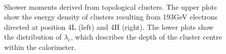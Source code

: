 \begin{figure}[!htb]
\begin{centering}
\\
\caption{Shower moments derived from topological clusters. The upper plots show the energy density of clusters resulting from 193GeV electrons directed at position 4L (left) and 4H (right). The lower plots show the distribution of $\lambda_c$, which describes the depth of the cluster centre within the calorimeter.} 
\label{LC_moments_electrons}
\end{centering}
\end{figure}


